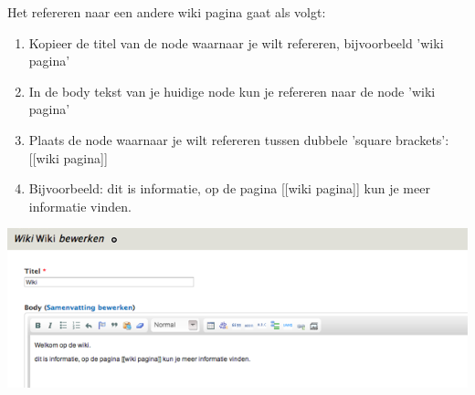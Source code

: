 Het refereren naar een andere wiki pagina gaat als volgt: 

\begin{enumerate}
\item Kopieer de titel van de node waarnaar je wilt refereren, bijvoorbeeld 'wiki pagina'
\item In de body tekst van je huidige node kun je refereren naar de node 'wiki pagina'
\item Plaats de node waarnaar je wilt refereren tussen dubbele 'square brackets': [[wiki pagina]]
\item Bijvoorbeeld: dit is informatie, op de pagina [[wiki pagina]] kun je meer informatie vinden.
\end{enumerate}

\bigskip

\begin{center}
	\includegraphics[width=\textwidth]{img/wiki.png}
\end{center}